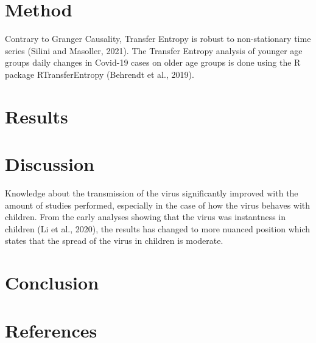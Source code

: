 \documentclass[]{elsarticle} %
\begin{document}
\hypertarget{method}{%
\section{Method}\label{method}}

Contrary to Granger Causality, Transfer Entropy is robust to
non-stationary time series (Silini and Masoller, 2021). The Transfer
Entropy analysis of younger age groups daily changes in Covid-19 cases
on older age groups is done using the R package RTransferEntropy
(Behrendt et al., 2019).

\hypertarget{results}{%
\section{Results}\label{results}}

\hypertarget{discussion}{%
\section{Discussion}\label{discussion}}

Knowledge about the transmission of the virus significantly improved
with the amount of studies performed, especially in the case of how the
virus behaves with children. From the early analyses showing that the
virus was instantness in children (Li et al., 2020), the results has
changed to more nuanced position which states that the spread of the
virus in children is moderate.

\hypertarget{conclusion}{%
\section{Conclusion}\label{conclusion}}

\hypertarget{references}{%
\section*{References}\label{references}}
\end{document}
